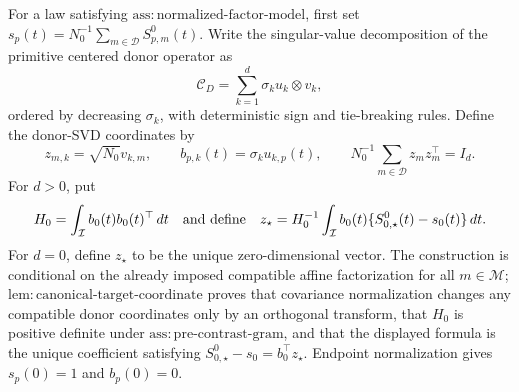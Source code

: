 For a law satisfying \(\mathrm{ass:normalized\mbox{-}factor\mbox{-}model}\), first set \(s_p(t)=N_0^{-1}\sum_{m\in\mathcal D}S^0_{p,m}(t)\). Write the singular-value decomposition of the primitive centered donor operator as
\[
 \mathcal C_D=\sum_{k=1}^d\sigma_k u_k\otimes v_k,
\]
ordered by decreasing \(\sigma_k\), with deterministic sign and tie-breaking rules. Define the donor-SVD coordinates by
\[
 z_{m,k}=\sqrt{N_0}v_{k,m},
 \qquad
 b_{p,k}(t)=\sigma_k u_{k,p}(t),
 \qquad
 N_0^{-1}\sum_{m\in\mathcal D}z_mz_m^\top=I_d.
\]
For \(d>0\), put
\[
 H_0=\int_{\mathcal I}b_0(t)b_0(t)^\top\,dt
 \quad\hbox{and define}\quad
 z_\star=H_0^{-1}\int_{\mathcal I}b_0(t)
 \{S^0_{0,\star}(t)-s_0(t)\}\,dt.
\]
For \(d=0\), define \(z_\star\) to be the unique zero-dimensional vector. The construction is conditional on the already imposed compatible affine factorization for all \(m\in\mathcal M\); \(\mathrm{lem:canonical\mbox{-}target\mbox{-}coordinate}\) proves that covariance normalization changes any compatible donor coordinates only by an orthogonal transform, that \(H_0\) is positive definite under \(\mathrm{ass:pre\mbox{-}contrast\mbox{-}gram}\), and that the displayed formula is the unique coefficient satisfying \(S^0_{0,\star}-s_0=b_0^\top z_\star\). Endpoint normalization gives \(s_p(0)=1\) and \(b_p(0)=0\).